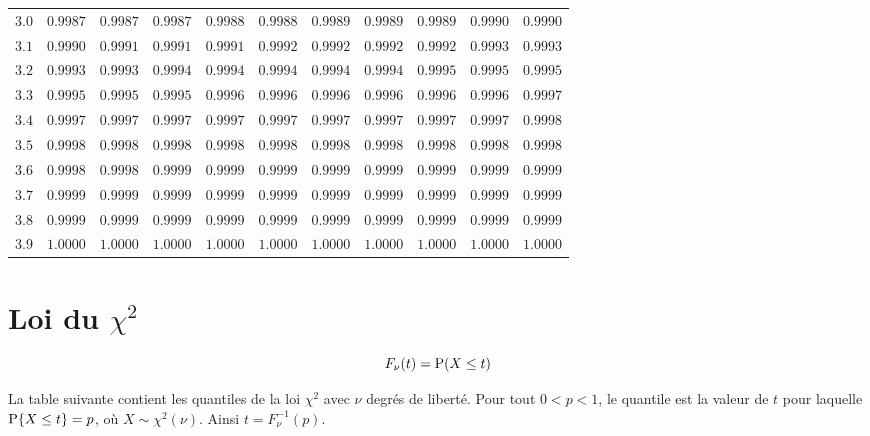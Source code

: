 \begin{center}
\begin{tabular}{| c | c | c | c | c | c | c | c | c | c | c |}
	\hline
	$3.0$ & $0.9987$ & $0.9987$ & $0.9987$ & $0.9988$ & $0.9988$ & $0.9989$ & $0.9989$ & $0.9989$ & $0.9990$ & $0.9990$ \\
	$3.1$ & $0.9990$ & $0.9991$ & $0.9991$ & $0.9991$ & $0.9992$ & $0.9992$ & $0.9992$ & $0.9992$ & $0.9993$ & $0.9993$ \\
	$3.2$ & $0.9993$ & $0.9993$ & $0.9994$ & $0.9994$ & $0.9994$ & $0.9994$ & $0.9994$ & $0.9995$ & $0.9995$ & $0.9995$ \\
	$3.3$ & $0.9995$ & $0.9995$ & $0.9995$ & $0.9996$ & $0.9996$ & $0.9996$ & $0.9996$ & $0.9996$ & $0.9996$ & $0.9997$ \\
	$3.4$ & $0.9997$ & $0.9997$ & $0.9997$ & $0.9997$ & $0.9997$ & $0.9997$ & $0.9997$ & $0.9997$ & $0.9997$ & $0.9998$ \\
	$3.5$ & $0.9998$ & $0.9998$ & $0.9998$ & $0.9998$ & $0.9998$ & $0.9998$ & $0.9998$ & $0.9998$ & $0.9998$ & $0.9998$ \\
	$3.6$ & $0.9998$ & $0.9998$ & $0.9999$ & $0.9999$ & $0.9999$ & $0.9999$ & $0.9999$ & $0.9999$ & $0.9999$ & $0.9999$ \\
	$3.7$ & $0.9999$ & $0.9999$ & $0.9999$ & $0.9999$ & $0.9999$ & $0.9999$ & $0.9999$ & $0.9999$ & $0.9999$ & $0.9999$ \\
	$3.8$ & $0.9999$ & $0.9999$ & $0.9999$ & $0.9999$ & $0.9999$ & $0.9999$ & $0.9999$ & $0.9999$ & $0.9999$ & $0.9999$ \\
	$3.9$ & $1.0000$ & $1.0000$ & $1.0000$ & $1.0000$ & $1.0000$ & $1.0000$ & $1.0000$ & $1.0000$ & $1.0000$ & $1.0000$ \\
	\hline
	\hline
\end{tabular}
\end{center}



\pagebreak

\section{Loi du $\chi^2$}
$$F_{\nu}(t)=\operatorname{P}(X \leq t)$$

La table suivante contient les quantiles de la loi $\chi^2$ avec $\nu$ degrés de liberté. Pour tout $0<p<1$, le quantile est la valeur de $t$ pour laquelle $\operatorname{P}\{X\leq t\}=p$, où $X\sim \chi^2(\nu)$. Ainsi $t=F^{-1}_{\nu}(p)$.



